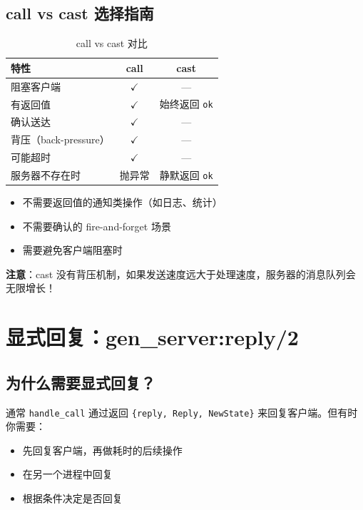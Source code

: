 \documentclass[a4paper,11pt]{article}
\begin{document}
\subsection{call vs cast 选择指南}

\begin{table}[H]
\centering
\begin{tabular}{@{}lcc@{}}
\toprule
\textbf{特性} & \textbf{call} & \textbf{cast} \\
\midrule
阻塞客户端 & $\checkmark$ & --- \\
有返回值 & $\checkmark$ & 始终返回 \texttt{ok} \\
确认送达 & $\checkmark$ & --- \\
背压（back-pressure） & $\checkmark$ & --- \\
可能超时 & $\checkmark$ & --- \\
服务器不存在时 & 抛异常 & 静默返回 \texttt{ok} \\
\bottomrule
\end{tabular}
\caption{call vs cast 对比}
\label{tab:call-vs-cast}
\end{table}

\begin{tipbox}
\begin{itemize}[leftmargin=1.5em]
    \item 不需要返回值的通知类操作（如日志、统计）
    \item 不需要确认的 fire-and-forget 场景
    \item 需要避免客户端阻塞时
\end{itemize}
\textbf{注意}：cast 没有背压机制，如果发送速度远大于处理速度，服务器的消息队列会无限增长！
\end{tipbox}


\section{显式回复：gen\_server:reply/2}

\subsection{为什么需要显式回复？}

通常 \texttt{handle\_call} 通过返回 \texttt{\{reply, Reply, NewState\}} 来回复客户端。但有时你需要：
\begin{itemize}[leftmargin=2em]
    \item 先回复客户端，再做耗时的后续操作
    \item 在另一个进程中回复
    \item 根据条件决定是否回复
\end{itemize}
\end{document}
